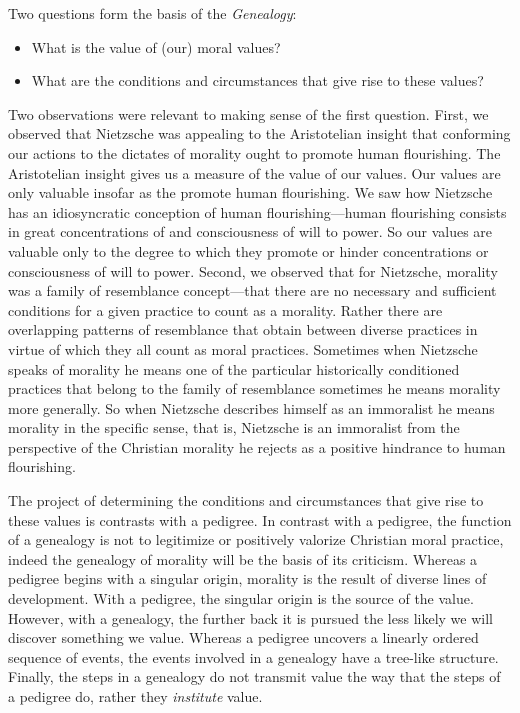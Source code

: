 Two questions form the basis of the \emph{Genealogy}:
\begin{itemize}
    \item What is the value of (our) moral values?
    \item What are the conditions and circumstances that give rise to these values?
\end{itemize}
Two observations were relevant to making sense of the first question. First, we observed that Nietzsche was appealing to the Aristotelian insight that conforming our actions to the dictates of morality ought to promote human flourishing. The Aristotelian insight gives us a measure of the value of our values. Our values are only valuable insofar as the promote human flourishing. We saw how Nietzsche has an idiosyncratic conception of human flourishing---human flourishing consists in great concentrations of and consciousness of will to power. So our values are valuable only to the degree to which they promote or hinder concentrations or consciousness of will to power. Second, we observed that for Nietzsche, morality was a family of resemblance concept---that there are no necessary and sufficient conditions for a given practice to count as a morality. Rather there are overlapping patterns of resemblance that obtain between diverse practices in virtue of which they all count as moral practices. Sometimes when Nietzsche speaks of morality he means one of the particular historically conditioned practices that belong to the family of resemblance sometimes he means morality more generally. So when Nietzsche describes himself as an immoralist he means morality in the specific sense, that is, Nietzsche is an immoralist from the perspective of the Christian morality he rejects as a positive hindrance to human flourishing. 

The project of determining the conditions and circumstances that give rise to these values is contrasts with a pedigree. In contrast with a pedigree, the function of a genealogy is not to legitimize or positively valorize Christian moral practice, indeed the genealogy of morality will be the basis of its criticism. Whereas a pedigree begins with a singular origin, morality is the result of diverse lines of development. With a pedigree, the singular origin is the source of the value. However, with a genealogy, the further back it is pursued the less likely we will discover something we value. Whereas a pedigree uncovers a linearly ordered sequence of events, the events involved in a genealogy have a tree-like structure. Finally, the steps in a genealogy do not transmit value the way that the steps of a pedigree do, rather they \emph{institute} value. \change


